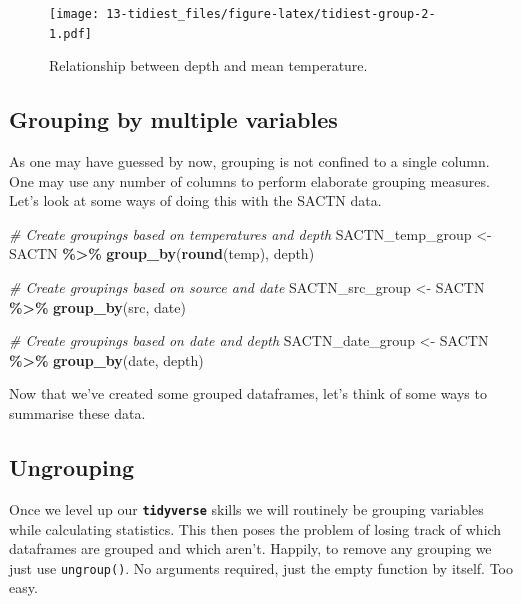 \documentclass[
]{book}
\newenvironment{Shaded}{\begin{snugshade}}{\end{snugshade}}
\newcommand{\CommentTok}[1]{\textcolor[rgb]{0.56,0.35,0.01}{\textit{#1}}}
\newcommand{\KeywordTok}[1]{\textcolor[rgb]{0.13,0.29,0.53}{\textbf{#1}}}
\newcommand{\NormalTok}[1]{#1}
\newcommand{\OperatorTok}[1]{\textcolor[rgb]{0.81,0.36,0.00}{\textbf{#1}}}
\newcommand{\StringTok}[1]{\textcolor[rgb]{0.31,0.60,0.02}{#1}}
\begin{document}
\begin{figure}
\centering
\texttt{[image: 13-tidiest\_files/figure-latex/tidiest-group-2-1.pdf]}
\caption{\label{fig:tidiest-group-2}Relationship between depth and mean temperature.}
\end{figure}

\hypertarget{grouping-by-multiple-variables}{%
\subsection{Grouping by multiple variables}\label{grouping-by-multiple-variables}}

As one may have guessed by now, grouping is not confined to a single column. One may use any number of columns to perform elaborate grouping measures. Let's look at some ways of doing this with the SACTN data.

\begin{Shaded}
\begin{Highlighting}[]
\CommentTok{\# Create groupings based on temperatures and depth}
\NormalTok{SACTN\_temp\_group <{-}}\StringTok{ }\NormalTok{SACTN }\OperatorTok{\%>\%}\StringTok{ }
\StringTok{  }\KeywordTok{group\_by}\NormalTok{(}\KeywordTok{round}\NormalTok{(temp), depth)}

\CommentTok{\# Create groupings based on source and date}
\NormalTok{SACTN\_src\_group <{-}}\StringTok{ }\NormalTok{SACTN }\OperatorTok{\%>\%}\StringTok{ }
\StringTok{  }\KeywordTok{group\_by}\NormalTok{(src, date)}

\CommentTok{\# Create groupings based on date and depth}
\NormalTok{SACTN\_date\_group <{-}}\StringTok{ }\NormalTok{SACTN }\OperatorTok{\%>\%}\StringTok{ }
\StringTok{  }\KeywordTok{group\_by}\NormalTok{(date, depth)}
\end{Highlighting}
\end{Shaded}

Now that we've created some grouped dataframes, let's think of some ways to summarise these data.

\hypertarget{ungrouping}{%
\subsection{Ungrouping}\label{ungrouping}}

Once we level up our \textbf{\texttt{tidyverse}} skills we will routinely be grouping variables while calculating statistics. This then poses the problem of losing track of which dataframes are grouped and which aren't. Happily, to remove any grouping we just use \texttt{ungroup()}. No arguments required, just the empty function by itself. Too easy.
\end{document}
